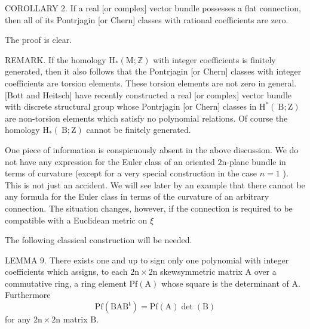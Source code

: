 \documentclass[10pt]{article}
\begin{document}
COROLLARY 2. If a real [or complex] vector bundle possesses a flat connection, then all of its Pontrjagin [or Chern] classes with rational coefficients are zero.

The proof is clear.

REMARK. If the homology $\mathrm{H}_{*}(\mathrm{M} ; \mathbb{Z})$ with integer coefficients is finitely generated, then it also follows that the Pontrjagin [or Chern] classes with integer coefficients are torsion elements. These torsion elements are not zero in general. [Bott and Heitsch] have recently constructed a real [or complex] vector bundle with discrete structural group whose Pontrjagin [or Chern] classes in $\mathrm{H}^{*}(\mathrm{~B} ; \mathrm{Z})$ are non-torsion elements which satisfy no polynomial relations. Of course the homology $\mathrm{H}_{*}(\mathrm{~B} ; \mathrm{Z})$ cannot be finitely generated.

One piece of information is conspicuously absent in the above discussion. We do not have any expression for the Euler class of an oriented $2 \mathrm{n}$-plane bundle in terms of curvature (except for a very special construction in the case $n=1$ ). This is not just an accident. We will see later by an example that there cannot be any formula for the Euler class in terms of the curvature of an arbitrary connection. The situation changes, however, if the connection is required to be compatible with a Euclidean metric on $\xi$

The following classical construction will be needed.

LEMMA 9. There exists one and up to sign only one polynomial with integer coefficients which assigns, to each $2 \mathrm{n} \times 2 \mathrm{n}$ skewsymmetric matrix A over a commutative ring, a ring element $\mathrm{Pf}(\mathrm{A})$ whose square is the determinant of A. Furthermore
$$
\mathrm{Pf}\left(\mathrm{BAB}^{\mathrm{t}}\right)=\mathrm{Pf}(\mathrm{A}) \operatorname{det}(\mathrm{B})
$$
for any $2 \mathrm{n} \times 2 \mathrm{n}$ matrix $\mathrm{B}$.
\end{document}
